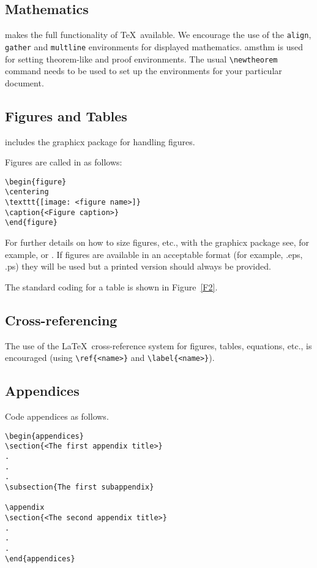 \documentclass[fonts]{icst}
\begin{document}
\subsection{Mathematics} \textsf{\journalclass} makes the full
functionality of \AmS\/\TeX\ available. We encourage the use of
the \verb"align", \verb"gather" and \verb"multline" environments
for displayed mathematics. \textsf{amsthm} is used for setting
theorem-like and proof environments. The usual \verb"\newtheorem"
command needs to be used to set up the environments for your
particular document.

\subsection{Figures and Tables} \textsf{\journalclass} includes the
\textsf{graphicx} package for handling figures.

Figures are called in as follows:
\begin{verbatim}
\begin{figure}
\centering
\texttt{[image: <figure name>]}
\caption{<Figure caption>}
\end{figure}
\end{verbatim}

For further details on how to size figures, etc., with the
\textsf{graphicx} package see, for example, \cite{R1}
or \cite{R3}. If figures are available in an
acceptable format (for example, .eps, .ps) they will be used but a
printed version should always be provided. \medbreak

The standard coding for a table is shown in Figure~\ref{F2}.

\subsection{Cross-referencing}
The use of the \LaTeX\ cross-reference system
for figures, tables, equations, etc., is encouraged
(using \verb"\ref{<name>}" and \verb"\label{<name>}").

\subsection{Appendices}
Code appendices as follows.
\begin{verbatim}
\begin{appendices}
\section{<The first appendix title>}
.
.
.
\subsection{The first subappendix}

\appendix
\section{<The second appendix title>}
.
.
.
\end{appendices}
\end{verbatim}
\end{document}
